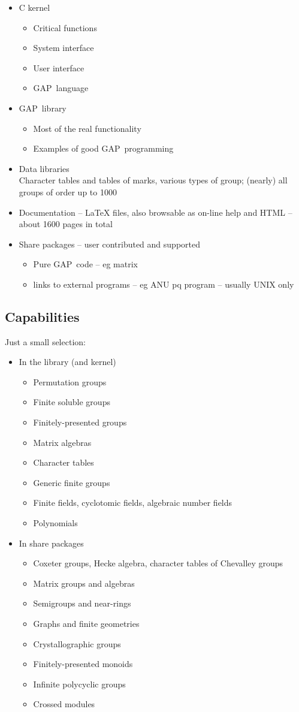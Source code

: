 \documentclass[11pt]{article}
\def\bs{\begin{slide}}
\def\es{\end{slide}}
\def\bi{\begin{itemize}}
\def\ei{\end{itemize}}
\def\GAP{\textsf{GAP}}
\begin{document}
\begin{slide}
\bi
\item C kernel
\bi
\item Critical functions
\item System interface
\item User interface
\item \GAP\ language
\ei
\item \GAP\ library
\bi
\item Most of the real functionality
\item Examples of good \GAP\ programming
\ei
\item Data libraries\\
Character tables and tables of marks, 
various types of group; (nearly) all groups of order up to 1000 
\item Documentation  -- LaTeX files, also browsable as on-line help
and HTML -- about 1600 pages in total
\item Share packages -- user contributed and supported
\bi
\item Pure \GAP\ code  -- eg matrix
\item links to external programs -- eg ANU pq program -- usually UNIX only
\ei
\ei

\es
\bs
\subsection{Capabilities}

Just a small selection:

\bi
\item In the library (and kernel)
\bi
\item Permutation groups 
\item Finite soluble groups 
\item Finitely-presented groups
\item Matrix algebras
\item Character tables
\item Generic finite groups
\item Finite fields, cyclotomic fields, algebraic number fields
\item Polynomials
\ei
\item In share packages
\bi
\item Coxeter groups, Hecke algebra, character tables of Chevalley
groups
\item Matrix groups and algebras
\item Semigroups and near-rings
\item Graphs and finite geometries
\item Crystallographic groups
\item Finitely-presented monoids
\item Infinite polycyclic groups
\item Crossed modules
\ei
\ei
\es
\end{document}
